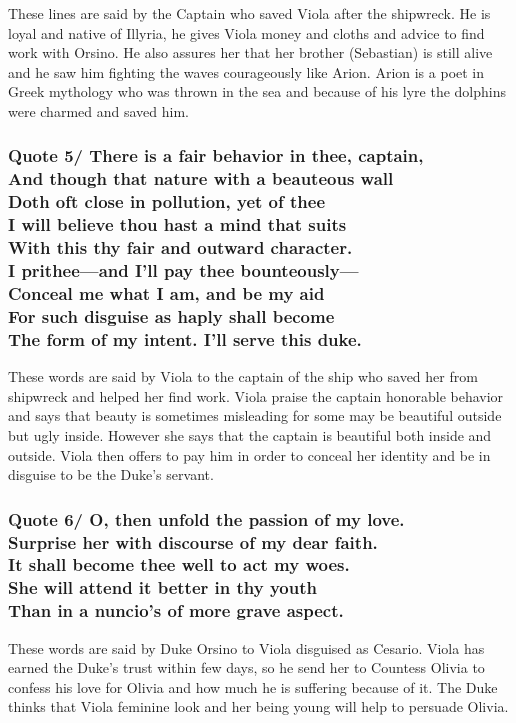\documentclass[12pt, a4paper]{article}
\begin{document}
These lines are said by the Captain who saved Viola after the shipwreck.
He is loyal and native of Illyria, he gives Viola money and cloths and
advice to find work with Orsino. He also assures her that her brother 
(Sebastian) is still alive and he saw 
him fighting the waves courageously like Arion. Arion is a poet in Greek
mythology who was thrown in the sea and because of his lyre the dolphins
were charmed and saved him.

\subsubsection*{Quote 5/
There is a fair behavior in thee, captain,\\
And though that nature with a beauteous wall\\
Doth oft close in pollution, yet of thee\\
I will believe thou hast a mind that suits\\
With this thy fair and outward character.\\
I prithee—and I’ll pay thee bounteously—\\
Conceal me what I am, and be my aid\\
For such disguise as haply shall become\\
The form of my intent. I’ll serve this duke.
}

These words are said by Viola to the captain of the ship who saved her
from shipwreck and helped her find work. Viola praise the captain 
honorable behavior and says that beauty is 
sometimes misleading for some may be beautiful outside but ugly inside.
However she says that the captain is beautiful both inside and outside.
Viola then offers to pay him in order to conceal her identity and be in
disguise to be the Duke's servant.

\subsubsection*{Quote 6/
O, then unfold the passion of my love.\\
Surprise her with discourse of my dear faith.\\
It shall become thee well to act my woes.\\
She will attend it better in thy youth\\
Than in a nuncio’s of more grave aspect.
}

These words are said by Duke Orsino to Viola disguised as Cesario.
Viola has earned the Duke's trust within few days, so he send her to 
Countess Olivia to confess his love for Olivia and how much he is 
suffering because of it. The Duke thinks that Viola feminine look and 
her being young will help to persuade Olivia.
\end{document}
